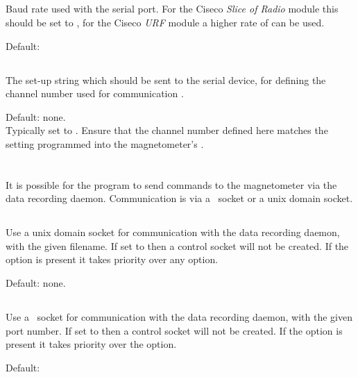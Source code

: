 \subsection{}
Baud rate used with the serial port. For the Ciseco \emph{Slice of
  Radio} module this should be set to , for the Ciseco
\emph{URF} module a higher rate of  can be used.

Default: 

\subsection{}
The set-up string which should be sent to the serial device, for
defining the channel number used for communication \etc.

Default: none.\\
Typically set to . Ensure that the
channel number defined here matches the setting programmed into the
magnetometer's \eeprom.

\section{\code{[controlsocket]}}

It is possible for the  program to send commands to
the magnetometer via the data recording daemon. Communication is via a
\udp\ socket or a unix domain socket. 

\subsection{}
Use a unix domain socket for communication with the data recording
daemon, with the given filename. If set to  then a
control socket will not be created. If the  option is
present it takes priority over any  option.

Default: none.

\subsection{}
Use a \udp\ socket for communication with the data recording
daemon, with the given port number. If set to  then a
control socket will not be created. If the  option is
present it takes priority over the  option.

Default: 

